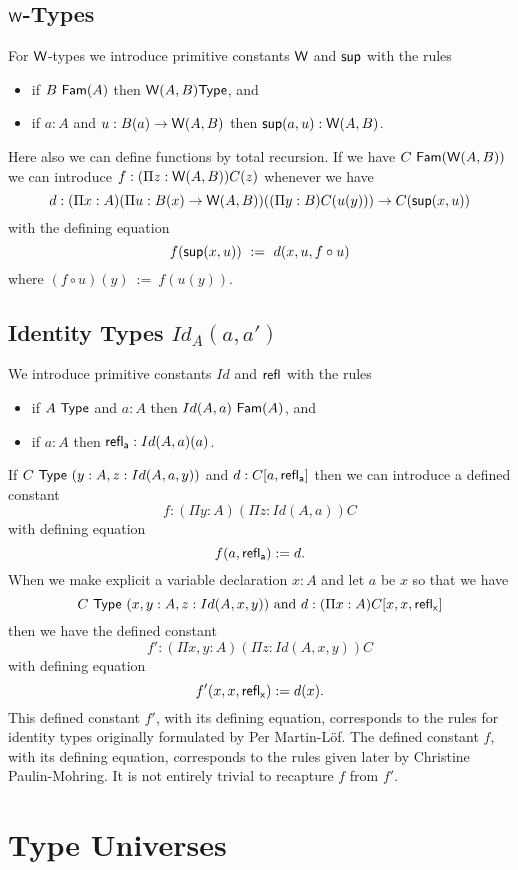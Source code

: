 \documentclass[10pt,a4paper]{article}
\newcommand{\Type}{{\sf Type}}
\newcommand{\SUP}{{\sf sup}}
\newcommand{\WW}{{\sf W}}
\newcommand{\Fam}{{\sf Fam}}
\newcommand{\refl}[1]{{\sf refl_{#1}}}
\begin{document}
\subsection*{$\WW$-Types}
For $\WW$-types we introduce primitive constants $\WW$ and $\SUP$ with the rules
\begin{itemize}
\item if $B~\Fam(A)$ then $\WW(A,B)\Type$, and
\item if $a:A$ and $u:B(a)\rightarrow \WW(A,B)$ then $\SUP(a,u):\WW(A,B)$.
\end{itemize}
 
 Here also we can define functions by total recursion. If we have
$C~\Fam(\WW(A,B))$ we can introduce $f:(\Pi z:\WW(A,B))C(z)$ whenever we have
$$
d:(\Pi x:A)(\Pi u:B(x)\rightarrow \WW(A,B))((\Pi y:B)C(u(y)))\rightarrow C(\SUP(x,u))
$$
with the defining equation
$$
f(\SUP(x,u)) ~:=~ d(x,u,f\circ u)
$$
where $(f\circ u)(y) ~:=~ f(u(y))$.

\subsection*{Identity Types $Id_A(a,a')$}
We introduce primitive constants $Id$ and $\refl{}$ with the rules
\begin{itemize}
\item if $A~\Type$ and $a:A$ then $Id(A,a)~\Fam(A)$, and
\item if $a:A$ then $\refl{a}:Id(A,a)(a)$.
\end{itemize}
If $C~\Type~(y:A,z:Id(A,a,y))$ and $d:C[a,\refl{a}]$ then we can introduce a defined constant 
  $$f:(\Pi y:A)(\Pi z:Id(A,a))C$$ 
with defining equation
  \[ f(a,\refl{a}):= d.\]
When we make explicit a variable declaration $x:A$ 
and let $a$ be $x$ 
so that we have 
  $$C~\Type~(x,y:A, z:Id(A,x,y))\mbox{ and  }d:(\Pi x:A)C[x,x,\refl{x}]$$ 
then we have the defined constant
  $$f':(\Pi x,y:A)(\Pi z:Id(A,x,y))C$$ 
with defining equation
  \[ f'(x,x,\refl{x}):= d(x).\]
This defined constant $f'$, with its defining equation, corresponds to the rules for identity types originally formulated by Per Martin-L\"{o}f.   The defined constant $f$, with its defining equation, corresponds to the rules given later by Christine Paulin-Mohring.  It is not entirely trivial to recapture $f$ from $f'$.


\section*{Type Universes}
\end{document}

